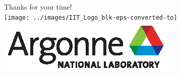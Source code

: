 \documentclass[professionalfonts,t]{beamer}
\begin{document}
\begin{frame}
\vspace{5em}
\Huge {Thanks for your time!} \\ 
\texttt{[image: ../images/IIT\_Logo\_blk-eps-converted-to]} %
\includegraphics[width=0.5\linewidth]{../images/Argonne_cmyk_black}%
\\
\end{frame}
\end{document}
